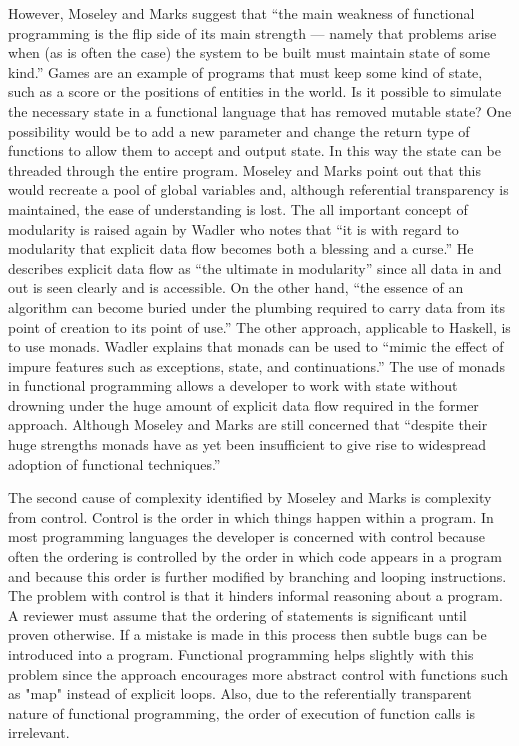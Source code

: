 However, Moseley and Marks suggest that ``the main weakness of functional programming
is the flip side of its main strength --- namely that problems arise when (as is often the
case) the system to be built must maintain state of some kind.'' Games are an
example of programs that must keep some kind of state, such as a score or the
positions of entities in the world. Is it possible to simulate the necessary state
in a functional language that has removed mutable state? One possibility would be
to add a new parameter and change the return type of functions to allow them to
accept and output state. In this way the state can be threaded through the entire
program. Moseley and Marks point out that this would recreate a pool of global
variables and, although referential transparency is maintained, the ease of understanding
is lost. The all important concept of modularity is raised again by Wadler who
notes that ``it is with regard to modularity that explicit data flow becomes both
a blessing and a curse.''\cite{wadler1995monads} He describes explicit data flow
as ``the ultimate in modularity'' since all data in and out is seen clearly and is
accessible. On the other hand, ``the essence of an algorithm can become buried under
the plumbing required to carry data from its point of creation to its point of use.''
The other approach, applicable to Haskell, is to use monads. Wadler explains that
monads can be used to ``mimic the effect of impure features such as exceptions,
state, and continuations.''\cite{wadler1992essence} The use of monads in functional
programming allows a developer to work with state without drowning under the huge
amount of explicit data flow required in the former approach. Although Moseley and Marks
are still concerned that ``despite their huge strengths monads have as yet been
insufficient to give rise to widespread adoption of functional techniques.''

The second cause of complexity identified by Moseley and Marks is complexity
from control. Control is the order in which things happen within a program.
In most programming languages the developer is concerned with control because
often the ordering is controlled by the order in which code appears in a program
and because this order is further modified by branching and looping instructions.
The problem with control is that it hinders informal reasoning about a program.
A reviewer must assume that the ordering of statements is significant until
proven otherwise. If a mistake is made in this process then subtle bugs can
be introduced into a program. Functional programming helps slightly with this
problem since the approach encourages more abstract control with functions
such as "map" instead of explicit loops. Also, due to the referentially transparent
nature of functional programming, the order of execution of function calls
is irrelevant.\cite{hughes1989whyfp}\cite{wadler1995monads}

